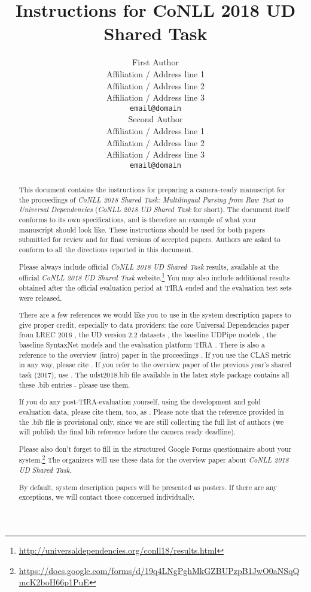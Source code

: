 \documentclass[11pt,a4paper]{article}
\title{Instructions for CoNLL 2018 UD Shared Task}
\author{First Author \\
  Affiliation / Address line 1 \\
  Affiliation / Address line 2 \\
  Affiliation / Address line 3 \\
  {\tt email@domain} \\\And
  Second Author \\
  Affiliation / Address line 1 \\
  Affiliation / Address line 2 \\
  Affiliation / Address line 3 \\
  {\tt email@domain} \\}
\date{}
\begin{document}
\maketitle

\newcommand{\udst}[0]{\emph{CoNLL 2018 UD Shared Task}}

\begin{abstract}
  This document contains the instructions for preparing a camera-ready
  manuscript for the proceedings of \emph{CoNLL 2018 Shared Task: 
  Multilingual Parsing from Raw Text to Universal Dependencies} 
  (\udst{} for short). The document itself conforms to its own      
  specifications, and is therefore an example of
  what your manuscript should look like. These instructions should be
  used for both papers submitted for review and for final versions of
  accepted papers.  Authors are asked to conform to all the directions
  reported in this document.
  
  Please always include official \udst{} results, available at the official \udst{} website.\footnote{\scriptsize \url{
http://universaldependencies.org/conll18/results.html}} You may also include additional results obtained after the official evaluation period at TIRA ended and the evaluation test sets were released.
  
  There are a few references we would like you to use in the system description papers to give proper credit, especially to data providers: the core Universal Dependencies paper from LREC 2016 \cite{ud}, the UD version 2.2 datasets \cite{ud22data}, the baseline UDPipe models \cite{udpipe}, the baseline SyntaxNet models \cite{syntaxnet} and the evaluation platform TIRA \cite{tira}. There is also a reference to the overview (intro) paper in the proceedings \cite{udst:overview}. If you use the CLAS metric in any way, please cite \cite{nivre17udw}. If you refer to the overview paper of the previous year's shared task (2017), use \cite{udst:overview2017}. The udst2018.bib file available in the latex style package contains all these .bib entries - please use them.
  
If you do any post-TIRA-evaluation yourself, using the development and gold evaluation data, please cite them, too, as \cite{ud20testdata}. Please note that the reference provided in the .bib file is provisional only, since we are still collecting the full list of authors (we will publish the final bib reference before the camera ready deadline). 
  
  Please also don't forget to fill in the structured Google Forms questionnaire about your system.\footnote{\scriptsize \url{https://docs.google.com/forms/d/19q4LNgPghMkGZBUPzpB1JwO0aNSqQmcK2boH66p1PuE}} The organizers will use these data for the overview paper about \udst{}.

By default, system description papers will be presented as posters. If there are any exceptions, we will contact those concerned individually.

\end{abstract}
\end{document}
